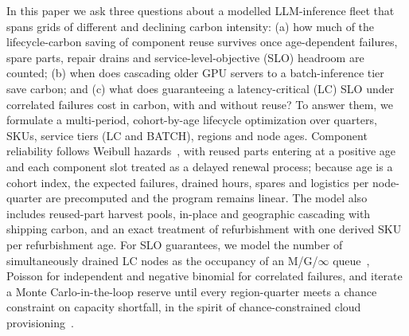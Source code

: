 \documentclass{article} %
\begin{document}
In this paper we ask three questions about a modelled LLM-inference fleet that spans grids of different and declining carbon intensity: (a) how much of the lifecycle-carbon saving of component reuse survives once age-dependent failures, spare parts, repair drains and service-level-objective (SLO) headroom are counted; (b) when does cascading older GPU servers to a batch-inference tier save carbon; and (c) what does guaranteeing a latency-critical (LC) SLO under correlated failures cost in carbon, with and without reuse? To answer them, we formulate a multi-period, cohort-by-age lifecycle optimization over quarters, SKUs, service tiers (LC and BATCH), regions and node ages. Component reliability follows Weibull hazards~\citep{Weibull1951StatisticalDistribution}, with reused parts entering at a positive age and each component slot treated as a delayed renewal process; because age is a cohort index, the expected failures, drained hours, spares and logistics per node-quarter are precomputed and the program remains linear. The model also includes reused-part harvest pools, in-place and geographic cascading with shipping carbon, and an exact treatment of refurbishment with one derived SKU per refurbishment age. For SLO guarantees, we model the number of simultaneously drained LC nodes as the occupancy of an M/G/$\infty$ queue~\citep{Eick1993PhysicsMtg}, Poisson for independent and negative binomial for correlated failures, and iterate a Monte Carlo-in-the-loop reserve until every region-quarter meets a chance constraint on capacity shortfall, in the spirit of chance-constrained cloud provisioning~\citep{Cohen2017OvercommitmentCloud}.
\end{document}
